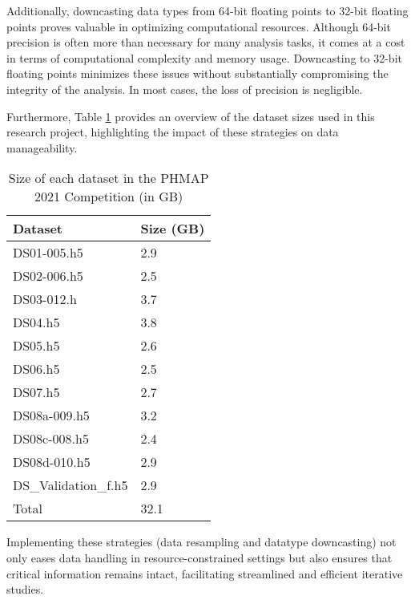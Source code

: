 \documentclass{IEEEtran}
\begin{document}
            Additionally, downcasting data types from 64-bit floating points to 32-bit floating points proves valuable in optimizing computational resources. Although 64-bit precision is often more than necessary for many analysis tasks, it comes at a cost in terms of computational complexity and memory usage. Downcasting to 32-bit floating points minimizes these issues without substantially compromising the integrity of the analysis. In most cases, the loss of precision is negligible.

            Furthermore, Table \ref{tab:raw_sizes} provides an overview of the dataset sizes used in this research project, highlighting the impact of these strategies on data manageability.
            \begin{table}[!htbp]
                \caption{Size of each dataset in the PHMAP 2021 Competition (in GB)}
                \label{tab:raw_sizes}
                \centering
                \begin{tabular}{ll}
                    \toprule
                    Dataset & Size (GB) \\
                    \midrule
                    DS01-005.h5 & 2.9 \\
                    DS02-006.h5 & 2.5 \\
                    DS03-012.h & 3.7 \\
                    DS04.h5 & 3.8 \\
                    DS05.h5 & 2.6 \\
                    DS06.h5 & 2.5 \\
                    DS07.h5 & 2.7 \\
                    DS08a-009.h5 & 3.2 \\
                    DS08c-008.h5 & 2.4 \\
                    DS08d-010.h5 & 2.9 \\
                    DS\_Validation\_f.h5 & 2.9 \\
                    \midrule
                    Total & 32.1 \\
                    \bottomrule
                \end{tabular}
            \end{table}

            Implementing these strategies (data resampling and datatype downcasting) not only eases data handling in resource-constrained settings but also ensures that critical information remains intact, facilitating streamlined and efficient iterative studies.
\end{document}
